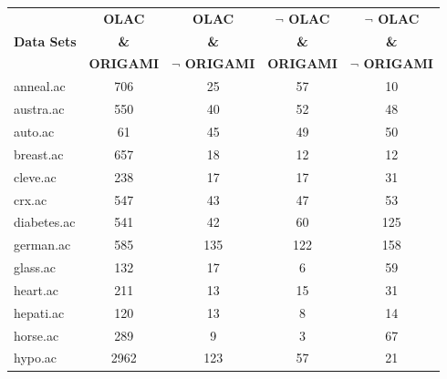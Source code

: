 \begin{table}[htbp]
	\centering
		\begin{tabular}{|l|c|c|c|c|}
		\hline
				& \textbf{OLAC}		& \textbf{OLAC}			& \textbf{$\neg$ OLAC}	& \textbf{$\neg$ OLAC}	\\
		\textbf{Data Sets}	& \textbf{\&}		& \textbf{\&}			& \textbf{\&}			& \textbf{\&}			\\
				& \textbf{ORIGAMI}	& \textbf{$\neg$ ORIGAMI}	& \textbf{ORIGAMI}		& \textbf{$\neg$ ORIGAMI}	\\
		\hline
		anneal.ac       & 706           & 25                 & 57                       & 10                            \\
		\hline
		austra.ac       & 550           & 40                 & 52                       & 48                            \\
		\hline
		auto.ac         & 61            & 45                 & 49                       & 50                            \\
		\hline
		breast.ac       & 657           & 18                 & 12                       & 12                            \\
		\hline
		cleve.ac        & 238           & 17                 & 17                       & 31                            \\
		\hline
		crx.ac          & 547           & 43                 & 47                       & 53                            \\
		\hline
		diabetes.ac     & 541           & 42                 & 60                       & 125                           \\
		\hline
		german.ac       & 585           & 135                & 122                      & 158                           \\
		\hline
		glass.ac        & 132           & 17                 & 6                        & 59                            \\
		\hline
		heart.ac        & 211           & 13                 & 15                       & 31                            \\
		\hline
		hepati.ac       & 120           & 13                 & 8                        & 14                            \\
		\hline
		horse.ac        & 289           & 9                  & 3                        & 67                            \\
		\hline
		hypo.ac         & 2962          & 123                & 57                       & 21                            \\

\end{tabular}
\end{table}
